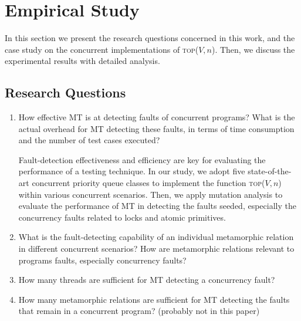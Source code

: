 \documentclass[conference]{IEEEtran}
\theoremstyle{remark}
\newtheorem*{rmk*}{Remark}
\newcommand{\Fn}{\textsc{top}}
\begin{document}

\section{Empirical Study}
\label{section:empirical}
In this section we present the research questions concerned in this work, and the case study on the concurrent implementations of \Fn($V,n$). Then, we discuss the experimental results with detailed analysis.

\subsection{Research Questions}
\label{section:questions}

\begin{enumerate}[RQ-1]
\item

How effective MT is at detecting faults of concurrent programs? What is the actual overhead for MT detecting these faults, in terms of time consumption and the number of test cases executed?

Fault-detection effectiveness and efficiency are key for evaluating the performance of a testing technique. In our study, we adopt five state-of-the-art concurrent priority queue classes to implement the function \Fn($V,n$) within various concurrent scenarios. Then, we apply mutation analysis to evaluate the performance of MT in detecting the faults seeded, especially the concurrency faults related  to locks and atomic primitives.
\item
What is the fault-detecting capability of an individual metamorphic relation in different concurrent scenarios? How are metamorphic relations relevant to programs faults, especially concurrency faults?

\item
How many threads are sufficient for MT detecting a concurrency fault? 

\item
How many metamorphic relations are sufficient for MT detecting the faults that remain in a concurrent program? ({\color{red}probably not in this paper})

\end{enumerate}
\end{document}
